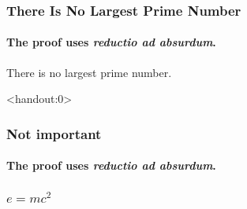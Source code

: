 \usepackage{amsthm}




\begin{frame}
    \titlepage
  \end{frame}
    
\begin{frame}
    \frametitle{There Is No Largest Prime Number} 
    \framesubtitle{The proof uses \textit{reductio ad absurdum}.}

    \begin{theorem}
        There is no largest prime number.
    \end{theorem}
\end{frame}

\begin{frame}<handout:0>
    \frametitle{Not important} 
    \framesubtitle{The proof uses \textit{reductio ad absurdum}.}
\end{frame}

\begin{frame}
    \frametitle{\(e = mc^2\)}
\end{frame}


